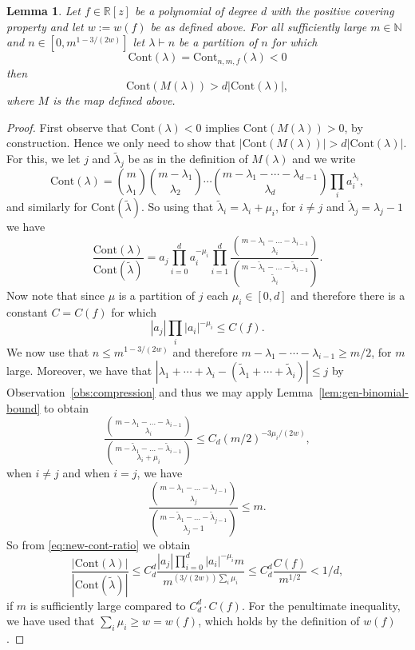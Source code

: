 \documentclass{daj}
\newcommand{\R}{\mathbb{R}}
\def\l{\lambda}
\def\N{\mathbb{N}}
\newcommand{\Cont}{\mathrm{Cont}}
\newcommand{\tlambda}{\widetilde{\lambda}}
\newtheorem{lemma}[theorem]{Lemma}
\theoremstyle{definition}
\theoremstyle{remark}
\begin{document}
\begin{lemma}\label{lem:combheart} Let $f \in \R[z]$ be a polynomial of degree $d$ with the positive covering property and let $w := w(f)$ be as defined above. 
For all sufficiently large $m \in \N$ and $n \in  [0, m^{1-3/(2w)} ]$ let $\lambda \vdash n$ be a partition of $n$ for which \[ \Cont(\l) = \Cont_{n,m,f}(\l) < 0\] then 
\[ \Cont(M(\l)) > d |\Cont(\l)|, \]where $M$ is the map defined above.  \end{lemma}



\begin{proof}
First observe that $\Cont(\l) < 0$ implies $\Cont(M(\l)) > 0$, by construction. Hence we only need to show that $|\Cont(M(\l))| > d|\Cont(\l)|$. 
For this, we let $j$ and $\tilde{\l}_j$ be as in the definition of $M(\l)$ and we write
\[ \Cont(\l) =\binom{m}{\l_1} \binom{m-\l_1}{\l_2} \cdots \binom{m-\l_1 -\cdots - \l_{d-1}}{\l_d} \prod_i a_i^{\l_i}, 
 \] and similarly for $\Cont(\tilde{\l})$. So using that $\tilde{\l}_i = \l_i + \mu_i$, for $i \not=j$ and $\tilde{\l}_j = \l_j-1$ we have
\begin{equation}\label{eq:new-cont-ratio}
\frac{\Cont(\lambda)}{\Cont(\tlambda)} = a_j\prod_{i=0}^d a_i^{-\mu_i} \prod_{i=1}^d 
\frac{ \binom{m - \l_1 - \dots -\l_{i-1}}{\l_i}}{\binom{m - \tilde{\l}_1 - \dots -\tilde{\l}_{i-1}}{\tilde{\l}_i}}.
\end{equation}
Now note that since $\mu$ is a partition of $j$ each $\mu_i \in [0,d]$ and therefore there is a constant $C = C(f)$ for which  
\[ |a_j|\prod_{i} |a_i|^{-\mu_i}  \leq C(f).\]
We now use that $n \leq m^{1-3/(2w)}$ and therefore $ m - \l_1 -\cdots - \l_{i-1} \geq m/2$, for $m$ large. Moreover, we have that 
$ \left| \l_1 + \cdots + \l_i - \left( \tilde{\l}_1 +\cdots + \tilde{\l}_i\right)\right| \leq j$ by Observation~\ref{obs:compression} and thus we may apply Lemma~\ref{lem:gen-binomial-bound} to obtain
\[ \frac{ \binom{m - \l_1 - \dots -\l_{i-1}}{\l_i}}{\binom{m - \tilde{\l}_1 - \dots -\tilde{\l}_{i-1}}{\l_i + \mu_i} } \leq   C_d (m/2)^{-3\mu_i/(2w)}, 
\] when $i \not= j$ and when $i=j$, we have
\[  \frac{ \binom{m - \l_1 - \dots -\l_{j-1}}{\l_j}}{\binom{m - \tilde{\l}_1 - \dots -\tilde{\l}_{j-1}}{\l_j - 1 } } \leq  m. 
\]So from \eqref{eq:new-cont-ratio} we obtain
\[ \frac{|\Cont(\lambda)|}{|\Cont(\tlambda)|} \leq C_d^d \frac{|a_j|\prod_{i=0}^d |a_i|^{-\mu_i}m}{ m^{(3/(2w))\sum_{ i }\mu_i}} \leq  C_d^d\frac{C(f)}{m^{1/2}} < 1/d, \] if $m$ is sufficiently large compared to $C_d^d \cdot C(f)$. For the penultimate inequality, we have used that $\sum_i \mu_i \geq w = w(f)$, which holds by the definition of $w(f)$.
\end{proof}
\end{document}
